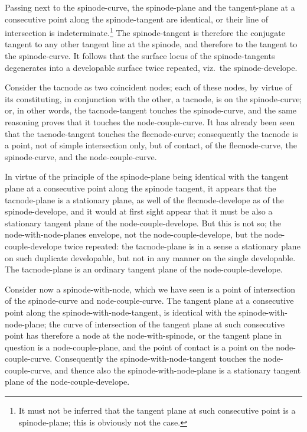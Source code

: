 \documentclass[11pt,a4paper]{article}
\theoremstyle{plain}
\begin{document}
Passing next to the spinode-curve, the spinode-plane and the tangent-plane at a consecutive point along the spinode-tangent are identical, or their line of intersection is indeterminate.\footnote{It must not be inferred that the tangent plane at such consecutive point is a spinode-plane; this is obviously not the case.} The spinode-tangent is therefore the conjugate tangent to any other tangent line at the spinode, and therefore to the tangent to the spinode-curve. It follows that the surface locus of the spinode-tangents degenerates into a developable surface twice repeated, viz.\ the spinode-develope.

Consider the tacnode as two coincident nodes; each of these nodes, by virtue of its constituting, in conjunction with the other, a tacnode, is on the spinode-curve; or, in other words, the tacnode-tangent touches the spinode-curve, and the same reasoning proves that it touches the node-couple-curve. It has already been seen that the tacnode-tangent touches the flecnode-curve; consequently the tacnode is a point, not of simple intersection only, but of contact, of the flecnode-curve, the spinode-curve, and the node-couple-curve.

In virtue of the principle of the spinode-plane being identical with the tangent plane at a consecutive point along the spinode tangent, it appears that the tacnode-plane is a stationary plane, as well of the flecnode-develope as of the spinode-develope, and it would at first sight appear that it must be also a stationary tangent plane of the node-couple-develope. But this is not so; the node-with-node-planes envelope, not the node-couple-develope, but the node-couple-develope twice repeated: the tacnode-plane is in a sense a stationary plane on such duplicate developable, but not in any manner on the single developable. The tacnode-plane is an ordinary tangent plane of the node-couple-develope.

Consider now a spinode-with-node, which we have seen is a point of intersection of the spinode-curve and node-couple-curve. The tangent plane at a consecutive point along the spinode-with-node-tangent, is identical with the spinode-with-node-plane; the curve of intersection of the tangent plane at such consecutive point has therefore a node at the node-with-spinode, or the tangent plane in question is a node-couple-plane, and the point of contact is a point on the node-couple-curve. Consequently the spinode-with-node-tangent touches the node-couple-curve, and thence also the spinode-with-node-plane is a stationary tangent plane of the node-couple-develope.
\end{document}
